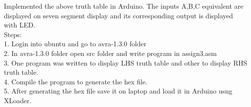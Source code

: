 \documentclass[10pt,a4paper]{article}
\begin{document}
Implemented the above truth table in Arduino. The inputs A,B,C equivalent are displayed on seven segment display and its corresponding output is displayed with LED.\\
Steps: \\
1. Login into ubuntu and go to avra-1.3.0 folder\\
2. In avra-1.3.0 folder open src folder and write program in assign3.asm\\
3. One program was written to display LHS truth table and other to display RHS truth table.\\
4. Compile the program to generate the hex file.\\
5. After generating the hex file save it on laptop and load it in Arduino usng XLoader.\\
\end{document}
